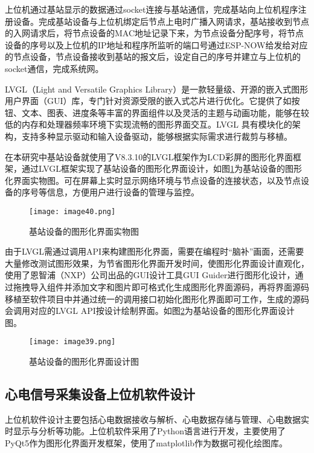 上位机通过基站显示的数据通过socket连接与基站通信，完成基站向上位机程序注册设备。完成基站设备与上位机绑定后节点上电时广播入网请求，基站接收到节点的入网请求后，将节点设备的MAC地址记录下来，为节点设备分配序号，将节点设备的序号以及上位机的IP地址和程序所监听的端口号通过ESP-NOW给发给对应的节点设备，节点设备接收到基站的报文后，设定自己的序号并建立与上位机的socket通信，完成系统网。

LVGL（Light and Versatile Graphics Library）是一款轻量级、开源的嵌入式图形用户界面（GUI）库，专门针对资源受限的嵌入式芯片进行优化。它提供了如按钮、文本、图表、进度条等丰富的界面组件以及灵活的主题与动画功能，能够在较低的内存和处理器频率环境下实现流畅的图形界面交互。LVGL 具有模块化的架构，支持多种显示驱动和输入设备驱动，能够根据实际需求进行裁剪与移植。

在本研究中基站设备就使用了V8.3.10的LVGL框架作为LCD彩屏的图形化界面框架，通过LVGL框架实现了基站设备的图形化界面设计，如图\ref{F.ECG_image40}为基站设备的图形化界面实物图。可在屏幕上实时显示网络环境与节点设备的连接状态，以及节点设备的序号等信息，方便用户进行设备的管理与监控。

\begin{figure}[htb]
    \centering
    \texttt{[image: image40.png]}
    \caption{基站设备的图形化界面实物图}
    \label{F.ECG_image40}
\end{figure}

由于LVGL需通过调用API来构建图形化界面，需要在编程时“脑补”画面，还需要大量修改测试图形效果，为节省图形化界面开发时间，使图形化界面设计直观化，使用了恩智浦（NXP）公司出品的GUI设计工具GUI Guider进行图形化设计，通过拖拽导入组件并添加文字和图片即可格式化生成图形化界面源码，再将界面源码移植至软件项目中并通过统一的调用接口初始化图形化界面即可工作，生成的源码会调用对应的LVGL API按设计绘制界面。如图\ref{F.ECG_image39}为基站设备的图形化界面设计图。

\begin{figure}[htb]
    \centering
    \texttt{[image: image39.png]}
    \caption{基站设备的图形化界面设计图}
    \label{F.ECG_image39}
\end{figure}

\subsection{心电信号采集设备上位机软件设计}

上位机软件设计主要包括心电数据接收与解析、心电数据存储与管理、心电数据实时显示与分析等功能。上位机软件采用了Python语言进行开发，主要使用了PyQt5作为图形化界面开发框架，使用了matplotlib作为数据可视化绘图库。

